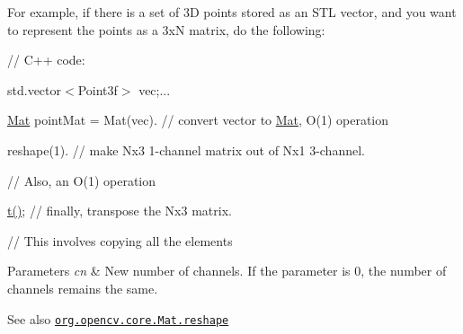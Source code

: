 For example, if there is a set of 3D points stored as an S\+TL vector, and you want to represent the points as a {\ttfamily 3xN} matrix, do the following\+: {\ttfamily }

{\ttfamily }

{\ttfamily }

{\ttfamily // C++ code\+:}

{\ttfamily }

{\ttfamily }

{\ttfamily std.\+vector$<$\+Point3f$>$ vec;...}

{\ttfamily }

{\ttfamily }

{\ttfamily \mbox{\hyperlink{classorg_1_1opencv_1_1core_1_1_mat}{Mat}} point\+Mat = Mat(vec). // convert vector to \mbox{\hyperlink{classorg_1_1opencv_1_1core_1_1_mat}{Mat}}, O(1) operation}

{\ttfamily }

{\ttfamily }

{\ttfamily reshape(1). // make Nx3 1-\/channel matrix out of Nx1 3-\/channel.}

{\ttfamily }

{\ttfamily }

{\ttfamily // Also, an O(1) operation}

{\ttfamily }

{\ttfamily }

{\ttfamily \mbox{\hyperlink{classorg_1_1opencv_1_1core_1_1_mat_a8df776cc748a0006e8837fcb7a1772f0}{t()}}; // finally, transpose the Nx3 matrix.}

{\ttfamily }

{\ttfamily }

{\ttfamily // This involves copying all the elements}

{\ttfamily }

{\ttfamily 
\begin{DoxyParams}{Parameters}
{\em cn} & New number of channels. If the parameter is 0, the number of channels remains the same.\\
\hline
\end{DoxyParams}
\begin{DoxySeeAlso}{See also}
\href{http://docs.opencv.org/modules/core/doc/basic_structures.html#mat-reshape}{\tt org.\+opencv.\+core.\+Mat.\+reshape} 
\end{DoxySeeAlso}
}\mbox{\label{classorg_1_1opencv_1_1core_1_1_mat_a39db00627baab6486e3065920941b9ec}} 
